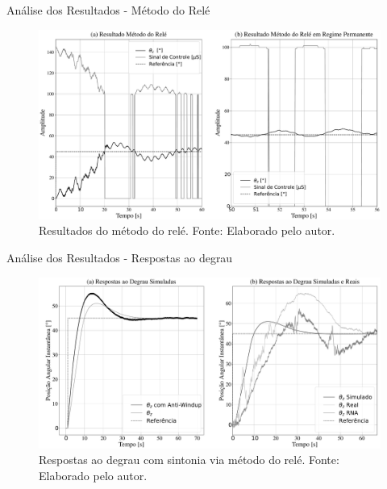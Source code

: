 \documentclass{beamer}
\begin{document}
\begin{frame}{Análise dos Resultados - Método do Relé}
     \begin{figure}[HT]
		\begin{center}
		\captionsetup{justification=centering}
        \includegraphics[scale=.22]{../resultados/img/relay}
        \caption{Resultados do método do relé. \newline
        		 Fonte: Elaborado pelo autor.}
		\label{FIG_ADAPTATIVO}
        \end{center}
	\end{figure}
\end{frame}


\begin{frame}{Análise dos Resultados - Respostas ao degrau}
     \begin{figure}[HT]
		\begin{center}
		\captionsetup{justification=centering}
        \includegraphics[scale=.18]{../resultados/img/pid_result}
        \caption{Respostas ao degrau com sintonia via método do relé. \newline
        		 Fonte: Elaborado pelo autor.}
		\label{FIG_ADAPTATIVO}
        \end{center}
	\end{figure}
\end{frame}
\end{document}
